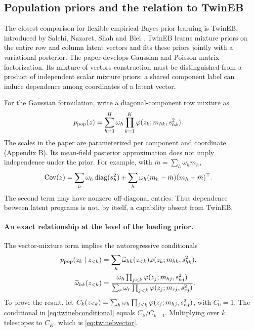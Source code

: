 \subsection{Population priors and the relation to TwinEB}
\label{sec:twineb}
The closest comparison for flexible empirical-Bayes prior learning is
TwinEB, introduced by Salehi, Nazaret, Shah and Blei
\cite{twineb}. TwinEB learns mixture priors on the entire row and column
latent vectors and fits these priors jointly with a variational posterior.
The paper develops Gaussian and Poisson matrix factorization.
Its mixture-of-vectors construction must be distinguished from a product
of independent scalar mixture priors: a shared component label can induce
dependence among coordinates of a latent vector.

For the Gaussian formulation, write a diagonal-component row mixture as
\begin{equation}\label{eq:twinebvector}
p_{\rm pop}(z)=\sum_{h=1}^H\omega_h
       \prod_{k=1}^K\varphi(z_k;m_{hk},s_{hk}^2).
\end{equation}
The scales in the paper are parameterized per component and coordinate
(Appendix B). Its mean-field posterior approximation does not imply
independence under the prior.
For example, with \(\bar m=\sum_h\omega_hm_h\),
\[
\operatorname{Cov}(z)=\sum_h\omega_h\operatorname{diag}(s_h^2)
       +\sum_h\omega_h(m_h-\bar m)(m_h-\bar m)^\top.
\]
The second term may have nonzero off-diagonal entries. Thus dependence
between latent programs is not, by itself, a capability absent from TwinEB.

\paragraph{An exact relationship at the level of the loading prior.}
The vector-mixture form implies the autoregressive conditionals
\begin{align}
p_{\rm pop}(z_k\mid z_{<k})
&=\sum_h\widetilde\omega_{hk}(z_{<k})
              \varphi(z_k;m_{hk},s_{hk}^2),\label{eq:twinebconditional}\\
\widetilde\omega_{hk}(z_{<k})
&=\frac{\omega_h\prod_{j<k}\varphi(z_j;m_{hj},s_{hj}^2)}
        {\sum_r\omega_r\prod_{j<k}\varphi(z_j;m_{rj},s_{rj}^2)}.
\label{eq:twinebgate}
\end{align}
To prove the result, let
\(C_k(z_{\leq k})=\sum_h\omega_h
\prod_{j\leq k}\varphi(z_j;m_{hj},s_{hj}^2)\), with \(C_0=1\).
The conditional in \eqref{eq:twinebconditional} equals
\(C_k/C_{k-1}\). Multiplying over \(k\) telescopes to \(C_K\), which
is \eqref{eq:twinebvector}.

